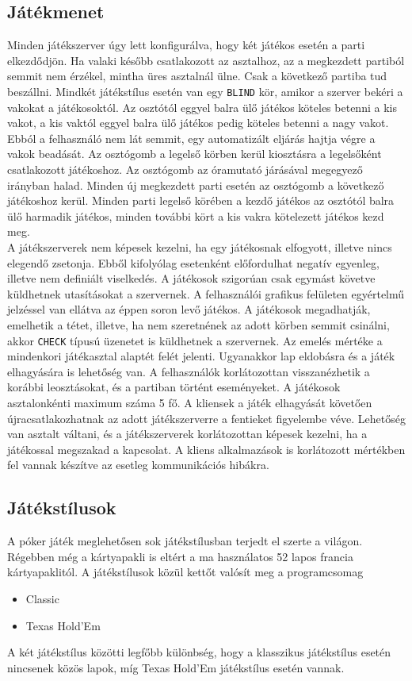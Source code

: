 \subsection{Játékmenet}
Minden játékszerver úgy lett konfigurálva, hogy két játékos esetén a parti elkezdődjön. Ha valaki később csatlakozott az asztalhoz, az a megkezdett partiból semmit nem érzékel, mintha üres asztalnál ülne. Csak a következő partiba tud beszállni. Mindkét játékstílus esetén van egy \texttt{BLIND} kör, amikor a szerver bekéri a vakokat a játékosoktól. Az osztótól eggyel balra ülő játékos köteles betenni a kis vakot, a kis vaktól eggyel balra ülő játékos pedig köteles betenni a nagy vakot. Ebból a felhasználó nem lát semmit, egy automatizált eljárás hajtja végre a vakok beadását. Az osztógomb  a legelső körben kerül kiosztásra a legelsőként csatlakozott játékoshoz. Az osztógomb az óramutató járásával megegyező irányban halad. Minden új megkezdett parti esetén az osztógomb a következő játékoshoz kerül. Minden parti legelső körében a kezdő játékos az osztótól balra ülő harmadik játékos, minden további kört a kis vakra kötelezett játékos kezd meg.  \\
A játékszerverek nem képesek kezelni, ha egy játékosnak elfogyott, illetve nincs elegendő zsetonja. Ebből kifolyólag esetenként előfordulhat negatív egyenleg, illetve nem definiált viselkedés. A játékosok szigorúan csak egymást követve küldhetnek utasításokat a szervernek. A felhasználói grafikus felületen egyértelmű jelzéssel van ellátva az éppen soron levő játékos. A játékosok megadhatják, emelhetik a tétet, illetve, ha nem szeretnének az adott körben semmit csinálni, akkor \texttt{CHECK} típusú üzenetet is küldhetnek a szervernek. Az emelés mértéke a mindenkori játékasztal alaptét felét jelenti. Ugyanakkor lap eldobásra és a játék elhagyására is lehetőség van. A felhasználók korlátozottan visszanézhetik a korábbi leosztásokat, és a partiban történt eseményeket. A játékosok asztalonkénti maximum száma 5 fő. A kliensek a játék elhagyását követően újracsatlakozhatnak az adott játékszerverre a fentieket figyelembe véve. Lehetőség van asztalt váltani, és a játékszerverek korlátozottan képesek kezelni, ha a játékossal megszakad a kapcsolat. A kliens alkalmazások is korlátozott mértékben fel vannak készítve az esetleg kommunikációs hibákra.

\clearpage

\subsection{Játékstílusok} \label{subsubsec:game_styles}
A póker játék meglehetősen sok játékstílusban terjedt el szerte a világon. Régebben még a kártyapakli is eltért a ma használatos 52 lapos francia kártyapaklitól. A játékstílusok közül kettőt valósít meg a programcsomag
\begin{itemize}[leftmargin=2cm]
\item Classic \cite{five_card_draw}
\item Texas Hold'Em \cite{texas_holdem}
\end{itemize}
A két játékstílus közötti legfőbb különbség, hogy a klasszikus játékstílus esetén nincsenek közös lapok, míg Texas Hold'Em játékstílus esetén vannak.

